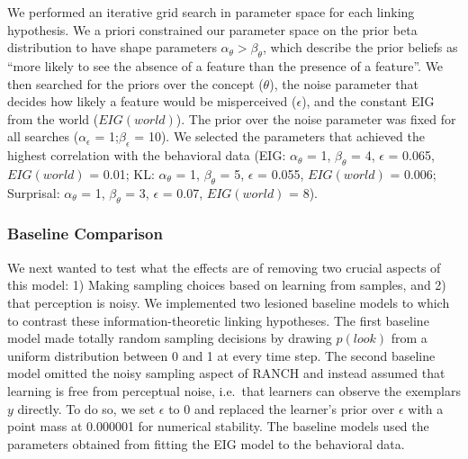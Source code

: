 \documentclass[10pt, letterpaper]{article}
\begin{document}
We performed an iterative grid search in parameter space for each
linking hypothesis. We a priori constrained our parameter space on the
prior beta distribution to have shape parameters
\(\alpha_{\theta} > \beta_{\theta}\), which describe the prior beliefs
as ``more likely to see the absence of a feature than the presence of a
feature''. We then searched for the priors over the concept
(\(\theta\)), the noise parameter that decides how likely a feature
would be misperceived (\(\epsilon\)), and the constant EIG from the
world (\(EIG(world)\)). The prior over the noise parameter was fixed for
all searches (\(\alpha_{\epsilon}\) = 1;\(\beta_{\epsilon}\) = 10). We
selected the parameters that achieved the highest correlation with the
behavioral data (EIG: \(\alpha_{\theta}\) = 1, \(\beta_{\theta}\) = 4,
\(\epsilon\) = 0.065, \(EIG(world)\) = 0.01; KL: \(\alpha_{\theta}\) =
1, \(\beta_{\theta}\) = 5, \(\epsilon\) = 0.055, \(EIG(world)\) = 0.006;
Surprisal: \(\alpha_{\theta}\) = 1, \(\beta_{\theta}\) = 3, \(\epsilon\)
= 0.07, \(EIG(world)\) = 8).

\hypertarget{baseline-comparison}{%
\subsubsection{Baseline Comparison}\label{baseline-comparison}}

We next wanted to test what the effects are of removing two crucial
aspects of this model: 1) Making sampling choices based on learning from
samples, and 2) that perception is noisy. We implemented two lesioned
baseline models to which to contrast these information-theoretic linking
hypotheses. The first baseline model made totally random sampling
decisions by drawing \(p(look)\) from a uniform distribution between 0
and 1 at every time step. The second baseline model omitted the noisy
sampling aspect of RANCH and instead assumed that learning is free from
perceptual noise, i.e.~that learners can observe the exemplars \(y\)
directly. To do so, we set \(\epsilon\) to 0 and replaced the learner's
prior over \(\epsilon\) with a point mass at 0.000001 for numerical
stability. The baseline models used the parameters obtained from fitting
the EIG model to the behavioral data.
\end{document}
